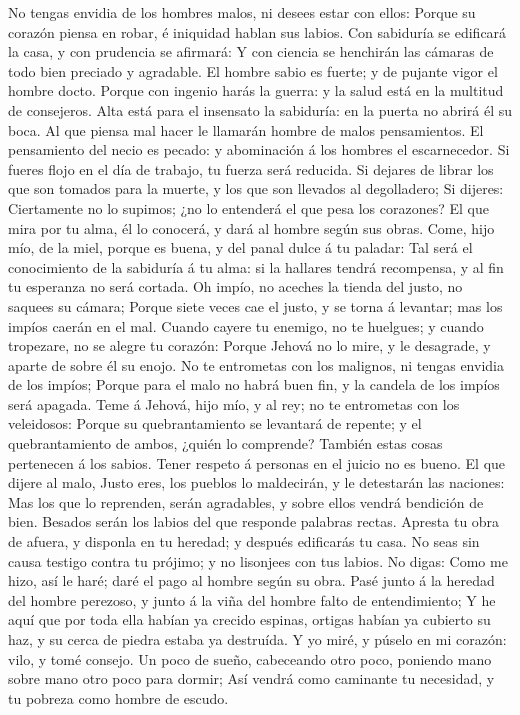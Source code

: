 No tengas envidia de los hombres malos, ni desees estar
con ellos:  Porque su corazón piensa en robar, é iniquidad
hablan sus labios.  Con sabiduría se edificará la casa, y
con prudencia se afirmará:  Y con ciencia se henchirán las
cámaras de todo bien preciado y agradable.  El hombre
sabio es fuerte; y de pujante vigor el hombre docto. 
Porque con ingenio harás la guerra: y la salud está en la multitud de
consejeros.  Alta está para el insensato la sabiduría: en
la puerta no abrirá él su boca.  Al que piensa mal hacer
le llamarán hombre de malos pensamientos.  El pensamiento
del necio es pecado: y abominación á los hombres el escarnecedor.
 Si fueres flojo en el día de trabajo, tu fuerza será
reducida.  Si dejares de librar los que son tomados para
la muerte, y los que son llevados al degolladero;  Si
dijeres: Ciertamente no lo supimos; ¿no lo entenderá el que pesa los
corazones? El que mira por tu alma, él lo conocerá, y dará al hombre
según sus obras.  Come, hijo mío, de la miel, porque es
buena, y del panal dulce á tu paladar:  Tal será el
conocimiento de la sabiduría á tu alma: si la hallares tendrá
recompensa, y al fin tu esperanza no será cortada.  Oh
impío, no aceches la tienda del justo, no saquees su cámara;
 Porque siete veces cae el justo, y se torna á levantar;
mas los impíos caerán en el mal.  Cuando cayere tu
enemigo, no te huelgues; y cuando tropezare, no se alegre tu corazón:
 Porque Jehová no lo mire, y le desagrade, y aparte de
sobre él su enojo.  No te entrometas con los malignos, ni
tengas envidia de los impíos;  Porque para el malo no
habrá buen fin, y la candela de los impíos será apagada. 
Teme á Jehová, hijo mío, y al rey; no te entrometas con los veleidosos:
 Porque su quebrantamiento se levantará de repente; y el
quebrantamiento de ambos, ¿quién lo comprende?  También
estas cosas pertenecen á los sabios. Tener respeto á personas en el
juicio no es bueno.  El que dijere al malo, Justo eres,
los pueblos lo maldecirán, y le detestarán las naciones: 
Mas los que lo reprenden, serán agradables, y sobre ellos vendrá
bendición de bien.  Besados serán los labios del que
responde palabras rectas.  Apresta tu obra de afuera, y
disponla en tu heredad; y después edificarás tu casa.  No
seas sin causa testigo contra tu prójimo; y no lisonjees con tus labios.
 No digas: Como me hizo, así le haré; daré el pago al
hombre según su obra.  Pasé junto á la heredad del hombre
perezoso, y junto á la viña del hombre falto de entendimiento;
 Y he aquí que por toda ella habían ya crecido espinas,
ortigas habían ya cubierto su haz, y su cerca de piedra estaba ya
destruída.  Y yo miré, y púselo en mi corazón: vilo, y
tomé consejo.  Un poco de sueño, cabeceando otro poco,
poniendo mano sobre mano otro poco para dormir;  Así
vendrá como caminante tu necesidad, y tu pobreza como hombre de escudo.

